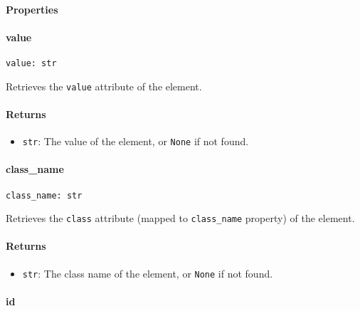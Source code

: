 \documentclass{article}
\begin{document}
\paragraph{Properties}
\paragraph{value}

\begin{lstlisting}[style=pythonstyle]
value: str
\end{lstlisting}

\noindent Retrieves the \lstinline[style=pythonstyle]|value| attribute of the element.

\paragraph{Returns}

\begin{itemize}
    \item \lstinline[style=pythonstyle]|str|: The value of the element, or \lstinline[style=pythonstyle]|None| if not found.
\end{itemize}

\paragraph{class\_name}

\begin{lstlisting}[style=pythonstyle]
class_name: str
\end{lstlisting}

\noindent Retrieves the \lstinline[style=pythonstyle]|class| attribute (mapped to \lstinline[style=pythonstyle]|class_name| property) of the element.

\paragraph{Returns}

\begin{itemize}
    \item \lstinline[style=pythonstyle]|str|: The class name of the element, or \lstinline[style=pythonstyle]|None| if not found.
\end{itemize}

\paragraph{id}
\end{document}
